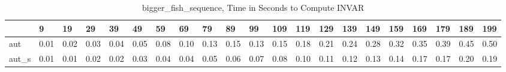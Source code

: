 \begin{table}
\caption{bigger_fish_sequence, Time in Seconds to Compute INVAR}
\label{bigger_fish_sequence_INVAR_time}
\begin{tabular}{lllllllllllllllllllll}
\toprule
 & 9 & 19 & 29 & 39 & 49 & 59 & 69 & 79 & 89 & 99 & 109 & 119 & 129 & 139 & 149 & 159 & 169 & 179 & 189 & 199 \\
\midrule
aut & 0.01 & 0.02 & 0.03 & 0.04 & 0.05 & 0.08 & 0.10 & 0.13 & 0.15 & 0.13 & 0.15 & 0.18 & 0.21 & 0.24 & 0.28 & 0.32 & 0.35 & 0.39 & 0.45 & 0.50 \\
aut_s & 0.01 & 0.01 & 0.02 & 0.02 & 0.03 & 0.04 & 0.04 & 0.05 & 0.06 & 0.07 & 0.08 & 0.10 & 0.11 & 0.12 & 0.13 & 0.14 & 0.17 & 0.17 & 0.20 & 0.19 \\
\bottomrule
\end{tabular}
\end{table}
